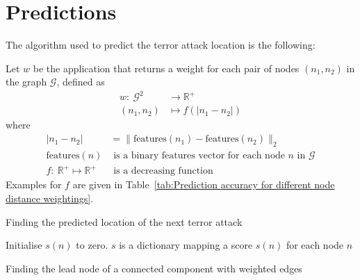 \section{Predictions}
\label{sec:Predictions}

The algorithm used to predict the terror attack location is the following:

Let $w$ be the application that returns a weight for each pair of nodes $(n_1,n_2)$ in the graph $\mathcal{G}$, defined as
\begin{align}
w:~ \mathcal{G}^2	& \to \mathbb{R}^+ \\
(n_1,n_2) 			& \mapsto f(|n_1-n_2|)
\end{align}
where
\begin{align}
|n_1-n_2| 				& = \| \text{features}(n_1)-\text{features}(n_2)\|_2 \\
\text{features}(n)		& \text{ is a binary features vector for each node }n\text{ in }\mathcal{G} \\
f:~	 \mathbb{R}^+ \mapsto  \mathbb{R}^+ 		&\text{ is a decreasing function}
\end{align}
Examples for $f$ are given in Table~\ref{tab:Prediction accuracy for different node distance weightings}.

\begin{algorithm}[H]
 
 \caption{Finding the predicted location of the next terror attack}
\end{algorithm}


\begin{algorithm}[H]
 
 
 Initialise $s(n)$ to zero. $s$ is a dictionary mapping a score $s(n)$ for each node $n$
 
 \caption{Finding the lead node of a connected component with weighted edges}
\end{algorithm}

